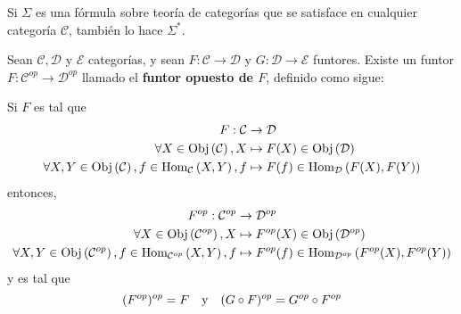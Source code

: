 \documentclass[12pt]{report}
\newcounter{it}
\theoremstyle{largebreak}
\newcommand\cf[3]{\ensuremath{#1:#2\rightarrow#3}}
\newcommand{\Obj}[1]{\ensuremath{\textup{Obj}\left(#1\right)}}
\newcommand{\Hom}[3]{\ensuremath{\textup{Hom}_{#1}\left(#2,#3\right)}}
\begin{document}
    \begin{propo}
        Si $\Sigma$ es una fórmula sobre teoría de categorías que se satisface en cualquier categoría $\mathcal{C}$, también lo hace $\Sigma^*$.
    \end{propo}

    \begin{mydef}
        Sean $\mathcal{C},\mathcal{D}$ y $\mathcal{E}$ categorías, y sean $\cf{F}{\mathcal{C}}{\mathcal{D}}$ y $\cf{G}{\mathcal{D}}{\mathcal{E}}$ funtores. Existe un funtor $\cf{F}{\mathcal{C}^{op}}{\mathcal{D}^{op}}$ llamado el \textbf{funtor opuesto de $F$}, definido como sigue:

        Si $F$ es tal que
        \begin{equation*}
            \begin{split}
                F:\mathcal{C}&\rightarrow \mathcal{D} \\
                \forall X\in\Obj{\mathcal{C}}, X&\mapsto F(X)\in\Obj{\mathcal{D}}\\
                \forall X,Y\in\Obj{\mathcal{C}},f\in\Hom{\mathcal{C}}{X}{Y}, f&\mapsto F(f)\in\Hom{\mathcal{D}}{F(X)}{F(Y)}\\
            \end{split}
        \end{equation*}
        entonces,
        \begin{equation*}
            \begin{split}
                F^{op}:\mathcal{C}^{op}&\rightarrow \mathcal{D}^{op} \\
                \forall X\in\Obj{\mathcal{C}^{op}}, X&\mapsto F^{op}(X)\in\Obj{\mathcal{D}^{op}}\\
                \forall X,Y\in\Obj{\mathcal{C}^{op}},f\in\Hom{\mathcal{C}^{op}}{X}{Y}, f&\mapsto F^{op}(f)\in\Hom{\mathcal{D}^{op}}{F^{op}(X)}{F^{op}(Y)}\\
            \end{split}
        \end{equation*}
        y es tal que
        \begin{equation*}
            (F^{op})^{op}=F\quad\textup{y}\quad (G\circ F)^{op}=G^{op}\circ F^{op}
        \end{equation*}
    \end{mydef}
\end{document}
